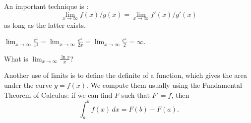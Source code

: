An important technique is : 
$$\lim_{x\to \infty} f(x)/g(x) = \lim_{x\to \infty} f'(x)/g'(x)$$ as long as the latter exists. 

\begin{Boxample}[3]
$\lim_{x\to\infty} \frac{e^x}{x^2} =  \lim_{x\to\infty} \frac{e^x}{2x} = \lim_{x\to\infty} \frac{e^x}{2} = \infty$.
\end{Boxample}
 
\begin{Boxample}[5]
What is  $\lim_{x\to\infty} \frac{\ln x}{x}$?
\end{Boxample}

Another use of limits is to define the definite  of a function, which gives the area under the curve $y=f(x)$. We compute them usually using the Fundamental Theorem of Calculus: if we can find $F$ such that $F' = f$, then 
$$
\int_a^b f(x) \, dx = F(b) - F(a).
$$

